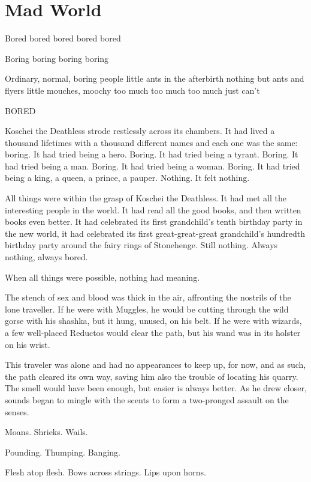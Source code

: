 \chapter{Mad World}

Bored bored bored bored bored

Boring boring boring boring

Ordinary, normal, boring people little ants in the afterbirth nothing but ants and flyers little mouches, moochy too much too much too much just can’t

BORED

Koschei the Deathless strode restlessly across its chambers. It had lived a thousand lifetimes with a thousand different names and each one was the same: boring. It had tried being a hero. Boring. It had tried being a tyrant. Boring. It had tried being a man. Boring. It had tried being a woman. Boring. It had tried being a king, a queen, a prince, a pauper. Nothing. It felt nothing.

All things were within the grasp of Koschei the Deathless. It had met all the interesting people in the world. It had read all the good books, and then written books even better. It had celebrated its first grandchild’s tenth birthday party in the new world, it had celebrated its first great-great-great grandchild’s hundredth birthday party around the fairy rings of Stonehenge. Still nothing. Always nothing, always bored.

When all things were possible, nothing had meaning.
\simpleline
{}

The stench of sex and blood was thick in the air, affronting the nostrils of the lone traveller. If he were with Muggles, he would be cutting through the wild gorse with his shashka, but it hung, unused, on his belt. If he were with wizards, a few well-placed Reductos would clear the path, but his wand was in its holster on his wrist.

This traveler was alone and had no appearances to keep up, for now, and as such, the path cleared its own way, saving him also the trouble of locating his quarry. The smell would have been enough, but easier is always better. As he drew closer, sounds began to mingle with the scents to form a two-pronged assault on the senses.

Moans. Shrieks. Wails.

Pounding. Thumping. Banging.

Flesh atop flesh. Bows across strings. Lips upon horns.

